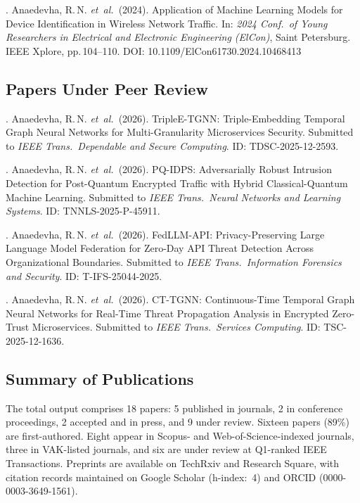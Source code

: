 . Anaedevha, R.\,N. \textit{et~al.}\ (2024). Application of Machine Learning Models for Device Identification in Wireless Network Traffic. In: \textit{2024 Conf.\ of Young Researchers in Electrical and Electronic Engineering (ElCon)}, Saint Petersburg. IEEE Xplore, pp.\,104--110. DOI: 10.1109/ElCon61730.2024.10468413

\subsection*{Papers Under Peer Review}

. Anaedevha, R.\,N. \textit{et~al.}\ (2026). TripleE-TGNN: Triple-Embedding Temporal Graph Neural Networks for Multi-Granularity Microservices Security. Submitted to \textit{IEEE Trans.\ Dependable and Secure Computing}. ID: TDSC-2025-12-2593.

. Anaedevha, R.\,N. \textit{et~al.}\ (2026). PQ-IDPS: Adversarially Robust Intrusion Detection for Post-Quantum Encrypted Traffic with Hybrid Classical-Quantum Machine Learning. Submitted to \textit{IEEE Trans.\ Neural Networks and Learning Systems}. ID: TNNLS-2025-P-45911.

. Anaedevha, R.\,N. \textit{et~al.}\ (2026). FedLLM-API: Privacy-Preserving Large Language Model Federation for Zero-Day API Threat Detection Across Organizational Boundaries. Submitted to \textit{IEEE Trans.\ Information Forensics and Security}. ID: T-IFS-25044-2025.

. Anaedevha, R.\,N. \textit{et~al.}\ (2026). CT-TGNN: Continuous-Time Temporal Graph Neural Networks for Real-Time Threat Propagation Analysis in Encrypted Zero-Trust Microservices. Submitted to \textit{IEEE Trans.\ Services Computing}. ID: TSC-2025-12-1636.

\subsection*{Summary of Publications}

The total output comprises 18 papers: 5 published in journals, 2 in conference proceedings, 2 accepted and in press, and 9 under review. Sixteen papers (89\%) are first-authored. Eight appear in Scopus- and Web-of-Science-indexed journals, three in VAK-listed journals, and six are under review at Q1-ranked IEEE Transactions. Preprints are available on TechRxiv and Research Square, with citation records maintained on Google Scholar (h-index:~4) and ORCID (0000-0003-3649-1561).



